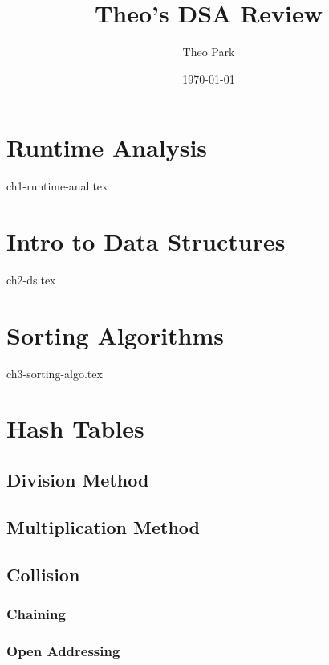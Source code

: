 \documentclass{report}
\title{Theo's DSA Review}
\author{Theo Park}
\date{\today}
\begin{document}
\maketitle

\pagestyle{fancy}


\tableofcontents


\chapter{Runtime Analysis}
{ch1-runtime-anal.tex}


\chapter{Intro to Data Structures}
{ch2-ds.tex}


\chapter{Sorting Algorithms}
{ch3-sorting-algo.tex}


\chapter{Hash Tables}

\section{Division Method}

\section{Multiplication Method}

\section{Collision}

\subsection{Chaining}

\subsection{Open Addressing}
\end{document}
